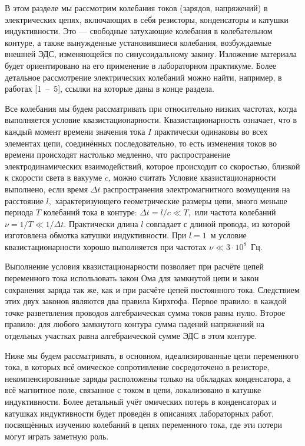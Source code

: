 
В этом разделе мы рассмотрим колебания токов (зарядов, напряжений) в электрических цепях, включающих в себя резисторы, конденсаторы и катушки индуктивности. Это --- свободные затухающие колебания в колебательном контуре, а также вынужденные установившиеся колебания, возбуждаемые внешней ЭДС, изменяющейся по синусоидальному закону. Изложение материала будет ориентировано на его применение в лабораторном практикуме. Более детальное рассмотрение электрических колебаний можно найти, например, в работах [1~--~5], ссылки на которые даны в конце раздела.

Все колебания мы будем рассматривать при относительно низких частотах, когда выполняется условие квазистационарности. Квазистационарность означает, что в каждый момент времени значения тока $I$ практически одинаковы во всех элементах цепи, соединённых последовательно, то есть изменения токов во времени происходят настолько медленно, что распространение электродинамических взаимодействий, которое происходит со скоростью, близкой к скорости света в вакууме $c$, можно считать  Условие квазистационарности выполнено, если время $\Delta t$ распространения электромагнитного возмущения на расстояние $l,$ характеризующего геометрические размеры цепи, много меньше периода $T$ колебаний тока в контуре: $\Delta t=l/c\ll T,$ или частота колебаний $\nu=1/T\ll1/\Delta t.$ Практически длина $l$ совпадает с длиной провода, из которой изготовлена обмотка катушки индуктивности. При $l=1$~м условие квазистационарности хорошо выполняется при частотах $\nu\ll3\cdot10^8$~Гц.

Выполнение условия квазистационарности позволяет при расчёте цепей переменного тока использовать закон Ома для замкнутой цепи и закон сохранения заряда так же, как и при расчёте цепей постоянного тока. Следствием этих двух законов являются два правила Кирхгофа. Первое правило: в каждой точке разветвления проводов алгебраическая сумма токов равна нулю. Второе правило: для любого замкнутого контура сумма падений напряжений на отдельных участках равна алгебраической сумме ЭДС в этом контуре. 

Ниже мы будем рассматривать, в основном, идеализированные цепи переменного тока, в которых всё омическое сопротивление сосредоточено в резисторе, некомпенсированные заряды расположены только на обкладках конденсатора, а всё магнитное поле, связанное с током в цепи, локализовано в катушке индуктивности. Более детальный учёт омических потерь в конденсаторах и катушках индуктивности будет проведён в описаниях лабораторных работ, посвящённых изучению колебаний в цепях переменного тока, где эти потери могут играть заметную роль.

